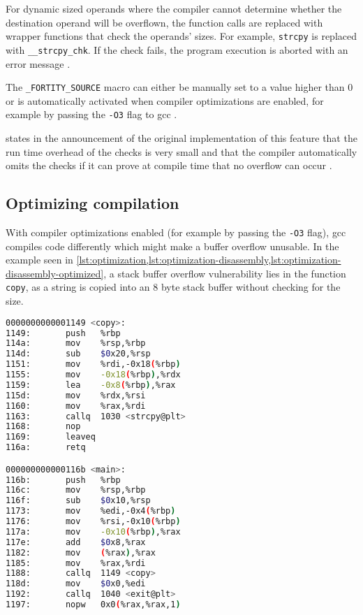For dynamic sized operands where the compiler cannot determine whether the destination operand will be overflown, the function calls are replaced with wrapper functions that check the operands' sizes.
For example, \texttt{strcpy} is replaced with \texttt{\_\_strcpy\_chk}.
If the check fails, the program execution is aborted with an error message \cite{Kerrisk2020,Sharma2014}.

The \texttt{\_FORTITY\_SOURCE} macro can either be manually set to a value higher than 0 or is automatically activated when compiler optimizations are enabled, for example by passing the \texttt{-O3} flag to \gls{gcc} \cite{Kerrisk2020,Sharma2014,Sidhpurwala2018}.

\citeauthor{Jelinek2004} states in the announcement of the original implementation of this feature that the run time overhead of the checks is very small and that the compiler automatically omits the checks if it can prove at compile time that no overflow can occur \cite{Jelinek2004}.

\subsection{Optimizing compilation}
\label{subsec:optimizing-compilation}

With compiler optimizations enabled (for example by passing the \texttt{-O3} flag), \gls{gcc} compiles code differently which might make a buffer overflow unusable.
In the example seen in \cref{lst:optimization,lst:optimization-disassembly,lst:optimization-disassembly-optimized}, a stack buffer overflow vulnerability lies in the function \texttt{copy}, as a string is copied into an 8 byte stack buffer without checking for the size.



\begin{lstlisting}[language=bash,float=ht,caption={Disassembly excerpt of the 64 bit binary compiled from the code in \cref{lst:optimization} with \texttt{gcc -o copy optimization.c -fno-stack-protector}, retrieved with \texttt{objdump -D --no-show-raw-insn copy}}, label={lst:optimization-disassembly}]
0000000000001149 <copy>:
1149:       push   %rbp
114a:       mov    %rsp,%rbp
114d:       sub    $0x20,%rsp
1151:       mov    %rdi,-0x18(%rbp)
1155:       mov    -0x18(%rbp),%rdx
1159:       lea    -0x8(%rbp),%rax
115d:       mov    %rdx,%rsi
1160:       mov    %rax,%rdi
1163:       callq  1030 <strcpy@plt>
1168:       nop
1169:       leaveq
116a:       retq

000000000000116b <main>:
116b:       push   %rbp
116c:       mov    %rsp,%rbp
116f:       sub    $0x10,%rsp
1173:       mov    %edi,-0x4(%rbp)
1176:       mov    %rsi,-0x10(%rbp)
117a:       mov    -0x10(%rbp),%rax
117e:       add    $0x8,%rax
1182:       mov    (%rax),%rax
1185:       mov    %rax,%rdi
1188:       callq  1149 <copy>
118d:       mov    $0x0,%edi
1192:       callq  1040 <exit@plt>
1197:       nopw   0x0(%rax,%rax,1)
\end{lstlisting}

